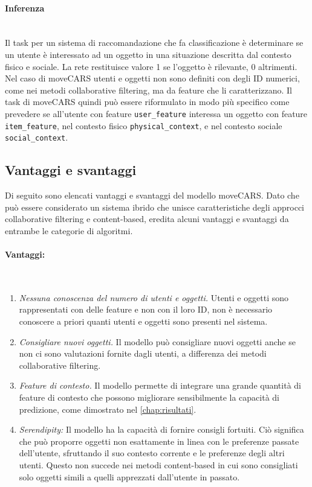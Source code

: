 \documentclass[12pt,italian]{report}
\newcommand{\myparagraph}[1]{\paragraph{#1}\mbox{}\\} %
\begin{document}
\myparagraph{Inferenza}
Il task per un sistema di raccomandazione che fa classificazione è determinare se un utente è interessato ad un oggetto in una situazione descritta dal contesto fisico e sociale. La rete restituisce valore 1 se l'oggetto è rilevante, 0 altrimenti. Nel caso di moveCARS utenti e oggetti non sono definiti con degli ID numerici, come nei metodi collaborative filtering, ma da feature che li caratterizzano. Il task di moveCARS quindi può essere riformulato in modo più specifico come prevedere se all'utente con feature \texttt{user\_feature} interessa un oggetto con feature \texttt{item\_feature}, nel contesto fisico \texttt{physical\_context}, e nel contesto sociale \texttt{social\_context}.

\subsection{Vantaggi e svantaggi}
Di seguito sono elencati vantaggi e svantaggi del modello moveCARS. Dato che può essere considerato un sistema ibrido che unisce caratteristiche degli approcci collaborative filtering e content-based, eredita alcuni vantaggi e svantaggi da entrambe le categorie di algoritmi.

\myparagraph{Vantaggi:}
\begin{enumerate}
 \item \textit{Nessuna conoscenza del numero di utenti e oggetti.} Utenti e oggetti sono rappresentati con delle feature e non con il loro ID, non è necessario conoscere a priori quanti utenti e oggetti sono presenti nel sistema.
 \item \textit{Consigliare nuovi oggetti.} Il modello può consigliare nuovi oggetti anche se non ci sono valutazioni fornite dagli utenti, a differenza dei metodi collaborative filtering.
 \item \textit{Feature di contesto.} Il modello permette di integrare una grande quantità di feature di contesto che possono migliorare sensibilmente la capacità di predizione, come dimostrato nel \autoref{chap:risultati}.
 \item \textit{Serendipity:} Il modello ha la capacità di fornire consigli fortuiti. Ciò significa che può proporre oggetti non esattamente in linea con le preferenze passate dell'utente, sfruttando il suo contesto corrente e le preferenze degli altri utenti. Questo non succede nei metodi content-based in cui sono consigliati solo oggetti simili a quelli apprezzati dall'utente in passato.
\end{enumerate}
\end{document}
